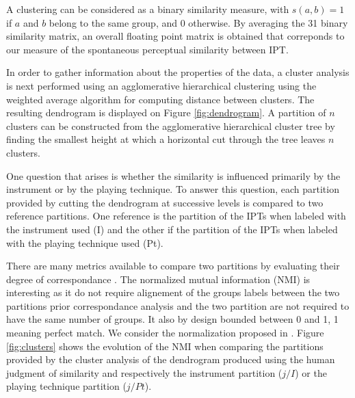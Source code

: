 \documentclass{article}
\newcommand{\ipt}{IPT\xspace}
\newcommand{\ipts}{IPTs\xspace}
\begin{document}
A clustering can be considered as a binary similarity measure, with $s(a, b) = 1$ if $a$ and $b$ belong to the same group, and $0$ otherwise. By averaging the 31 binary similarity matrix, an overall floating point matrix is obtained that correponds to our measure of the spontaneous perceptual similarity between \ipt.

In order to gather information about the properties of the data, a cluster analysis is next performed using an agglomerative hierarchical clustering \cite{gordon1987review} using the weighted average algorithm for computing distance between clusters. The resulting dendrogram is displayed on Figure \ref{fig:dendrogram}. A partition of $n$ clusters can be constructed from the agglomerative hierarchical cluster tree by finding the smallest height at which a horizontal cut through the tree leaves $n$ clusters.

One question that arises is whether the similarity is influenced primarily by the instrument or by the playing technique. To answer this question, each partition provided by cutting the dendrogram at successive levels is compared to two reference partitions. One reference is the partition of the \ipts when labeled with the instrument used (I) and the other if the partition of the \ipts when labeled with the playing technique used (Pt).

There are many metrics available to compare two partitions by evaluating their degree of correspondance \cite{wagner2007comparing}. The normalized mutual information (NMI) is interesting as it do not require alignement of the groups labels between the two partitions prior correspondance analysis and the two partition are not required to have the same number of groups. It also by design bounded between 0 and 1, 1 meaning perfect match. We consider the normalization proposed in \cite{strehl2002cluster}. Figure \ref{fig:clusters} shows the evolution of the NMI when comparing the partitions provided by the cluster analysis of the dendrogram produced using the human judgment of similarity and respectively the instrument partition ($j/I$) or the playing technique partition ($j/Pt$).
\end{document}
